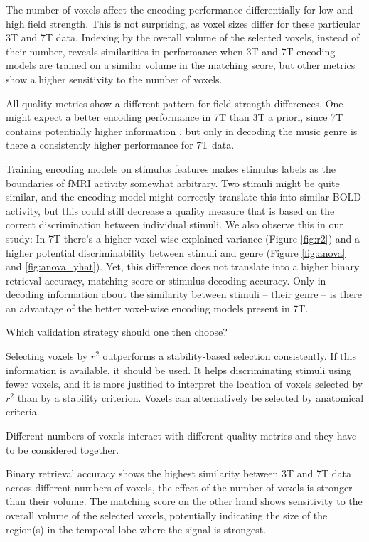 The number of voxels affect the encoding performance differentially for low and
high field strength. This is not surprising, as voxel sizes differ for these
particular 3T and 7T data. Indexing by the overall volume of the selected
voxels, instead of their number, reveals similarities in performance when 3T
and 7T encoding models are trained on a similar volume in the matching
score, but other metrics show a higher sensitivity to the number of
voxels.

All quality metrics show a different pattern for field strength differences.
One might expect a better encoding performance in 7T than 3T a priori, since 7T contains
potentially higher information \citep{FK12}, but only in decoding the music genre
is there a consistently higher performance for 7T data.

Training encoding models on stimulus features makes stimulus labels as the
boundaries of f{MRI} activity somewhat arbitrary. Two stimuli might be quite
similar, and the encoding model might correctly translate this into similar BOLD
activity, but this could still decrease a quality measure that is based on the
correct discrimination between individual stimuli. We also observe this in our
study: In 7T there's a higher voxel-wise explained variance (Figure \ref{fig:r2}) and a higher potential discriminability
between stimuli and genre (Figure \ref{fig:anova} and \ref{fig:anova_yhat}). Yet, this difference does not translate into a higher
binary retrieval accuracy, matching score or stimulus decoding accuracy. Only
in decoding information about the similarity between stimuli -- their genre
-- is there an advantage of the better voxel-wise encoding models present in
7T.

Which validation strategy should one then choose?

Selecting voxels by $r^2$ outperforms a stability-based selection consistently.
If this information is available, it should be used. It helps
discriminating stimuli using fewer voxels, and it is more justified to interpret
the location of voxels selected by $r^2$ than by a stability criterion.
Voxels can alternatively be selected by anatomical criteria.

Different numbers of voxels interact with different quality metrics and they
have to be considered together. 

Binary retrieval accuracy shows the highest similarity between 3T and 7T data
across different numbers of voxels, the effect of the number of voxels is
stronger than their volume. The matching score on the other hand shows
sensitivity to the overall volume of the selected voxels, potentially indicating
the size of the region(s) in the temporal lobe where the signal is strongest.

